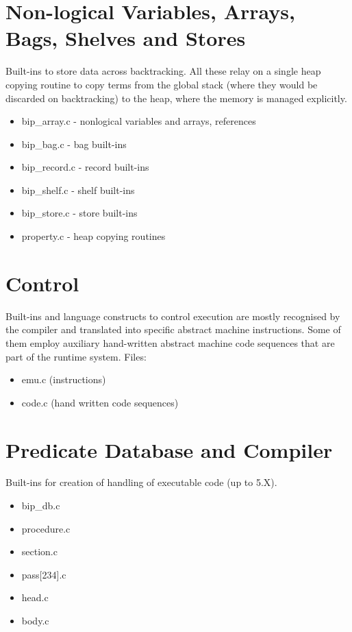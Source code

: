 \section{Non-logical Variables, Arrays, Bags, Shelves and Stores }
Built-ins to store data across backtracking. All these relay on a single heap
copying routine to copy terms from the global stack (where they would be
discarded on backtracking) to the heap, where the memory is managed explicitly.
     \begin{itemize}
     \item bip_array.c - nonlogical variables and arrays, references
     \item bip_bag.c - bag built-ins
     \item bip_record.c - record built-ins
     \item bip_shelf.c - shelf built-ins
     \item bip_store.c - store built-ins
     \item property.c - heap copying routines
     \end{itemize}

\section{Control}
Built-ins and language constructs to control execution are mostly
recognised by the compiler and translated into specific abstract machine
instructions. Some of them employ auxiliary hand-written abstract machine
code sequences that are part of the runtime system. Files:
     \begin{itemize}
     \item emu.c (instructions)
     \item code.c (hand written code sequences)
     \end{itemize}

\section{Predicate Database and Compiler }
Built-ins for creation of handling of executable code (up to {\eclipse} 5.X).
     \begin{itemize}
     \item bip_db.c
     \item procedure.c
     \item section.c
     \item pass[234].c
     \item head.c
     \item body.c
     \end{itemize}

